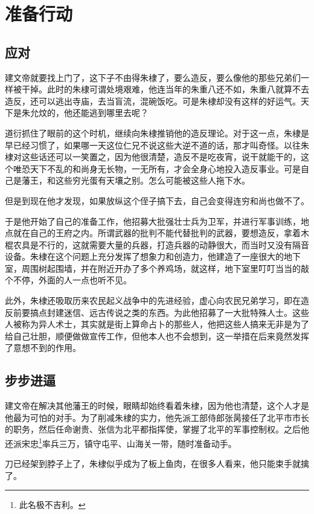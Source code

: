 \section{准备行动}
\ifnum{}
	\begin{multicols}{\theparacolNo}
		\fi
		\subsection{应对}
		建文帝就要找上门了，这下子不由得朱棣了，要么造反，要么像他的那些兄弟们一样被干掉。此时的朱棣可谓处境艰难，他连当年的朱重八还不如，朱重八就算不去造反，还可以逃出寺庙，去当盲流，混碗饭吃。可是朱棣却没有这样的好运气。天下是朱允炆的，他还能逃到哪里去呢？

		道衍抓住了眼前的这个时机，继续向朱棣推销他的造反理论。对于这一点，朱棣是早已经习惯了，如果哪一天这位仁兄不说这些大逆不道的话，那才叫奇怪。以往朱棣对这些话还可以一笑置之，因为他很清楚，造反不是吃夜宵，说干就能干的，这个唯恐天下不乱的和尚身无长物，一无所有，才会全身心地投入造反事业。可是自己是藩王，和这些穷光蛋有天壤之别。怎么可能被这些人拖下水。

		但是到现在他才发现，如果放纵这个侄子搞下去，自己会变得连穷和尚也做不了。

		于是他开始了自己的准备工作，他招募大批强壮士兵为卫军，并进行军事训练，地点就在自己的王府之内。所谓武器的批判不能代替批判的武器，要想造反，拿着木棍农具是不行的，这就需要大量的兵器，打造兵器的动静很大，而当时又没有隔音设备。朱棣在这个问题上充分发挥了想象力和创造力，他建造了一座很大的地下室，周围树起围墙，并在附近开办了多个养鸡场，就这样，地下室里叮叮当当的敲个不停，外面的人一点也听不见。

		此外，朱棣还吸取历来农民起义战争中的先进经验，虚心向农民兄弟学习，即在造反前要搞点封建迷信、远古传说之类的东西。为此他招募了一大批特殊人士。这些人被称为异人术士，其实就是街上算命占卜的那些人，他把这些人搞来无非是为了给自己壮胆，顺便做做宣传工作，但他本人也不会想到，这一举措在后来竟然发挥了意想不到的作用。

		\subsection{步步进逼}
		建文帝在解决其他藩王的时候，眼睛却始终看着朱棣，因为他也清楚，这个人才是他最为可怕的对手。为了削减朱棣的实力，他先派工部侍郎张昺接任了北平市市长的职务，然后任命谢贵、张信为北平都指挥使，掌握了北平的军事控制权。之后他还派宋忠\footnote{此名极不吉利。}率兵三万，镇守屯平、山海关一带，随时准备动手。

		刀已经架到脖子上了，朱棣似乎成为了板上鱼肉，在很多人看来，他只能束手就擒了。


\end{multicols}
